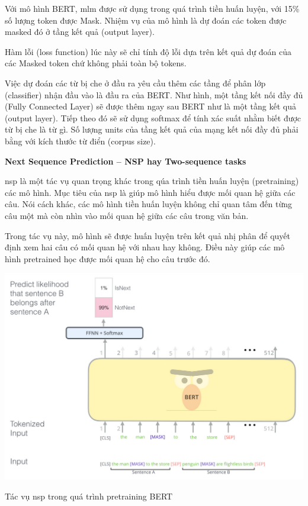 \documentclass[a4paper, 12pt, openany]{book}
\begin{document}
\begin{enumerate}
    Với mô hình BERT, \ac{mlm} được sử dụng trong quá trình tiền huấn luyện, với 15\% số lượng token được Mask.
    Nhiệm vụ của mô hình là dự đoán các token được masked đó ở tầng kết quả (output layer).

    Hàm lỗi (loss function) lúc này sẽ chỉ tính độ lỗi dựa trên kết quả dự đoán của các Masked token chứ không phải toàn bộ tokens.

    Việc dự đoán các từ bị che ở đầu ra yêu cầu thêm các tầng để phân
    lớp (classifier) nhận đầu vào là đầu ra của BERT. Như hình, một tầng kết nối đầy đủ (Fully Connected Layer) sẽ được thêm ngay sau 
    BERT như là một tầng kết quả (output layer).
    Tiếp theo đó sẽ sử dụng softmax để tính xác suất nhằm biết được từ bị che là từ gì. Số lượng units của tầng kết quả của mạng kết nối đầy đủ 
    phải bằng với kích thước từ điển (corpus size).

\end{enumerate}

\textbf{Next Sequence Prediction – NSP hay Two-sequence tasks}

\ac{nsp} là một tác vụ quan trọng khác trong qúa trình tiền huấn luyện (pretraining) các mô hình.
Mục tiêu của \ac{nsp} là giúp mô hình hiểu được mối quan hệ giữa các câu. Nói cách
khác, các mô hình tiền huấn luyện không chỉ quan tâm đến từng câu một mà còn nhìn vào mối quan hệ giữa
các câu trong văn bản.

Trong tác vụ này, mô hình sẽ được huấn luyện trên kết quả nhị phân để quyết định xem hai câu có mối quan hệ với nhau hay không.
Điều này giúp các mô hình pretrained học được mối quan hệ cho câu trước đó.

\begin{minipage}{\linewidth}
    \captionsetup{type=figure}
    \centering
    \includegraphics[width=\linewidth]{./assets/images/BERT-nsp.png}
    \caption{Tác vụ \ac{nsp} trong quá trình pretraining BERT}
\end{minipage}
\vspace{0.5cm}
\end{document}
